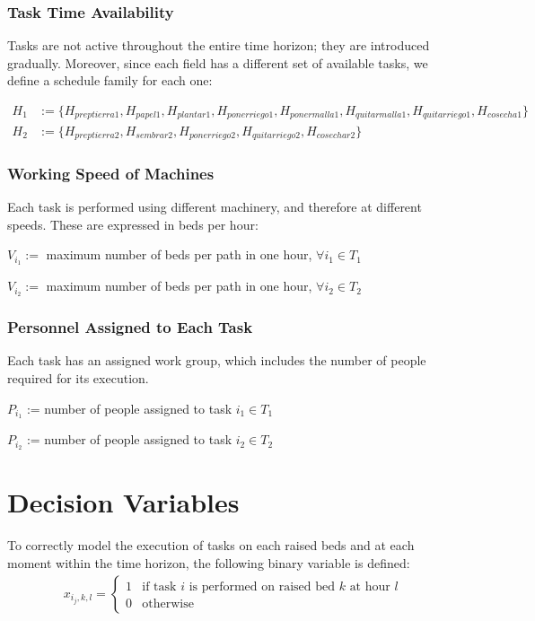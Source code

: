 \subsubsection{Task Time Availability}

Tasks are not active throughout the entire time horizon; they are introduced gradually.  
Moreover, since each field has a different set of available tasks, we define a schedule family for each one:

\[\begin{aligned}
    H_1 &:= \{H_{preptierra1},H_{papel1},H_{plantar1},H_{ponerriego1},H_{ponermalla1},H_{quitarmalla1},H_{quitarriego1},H_{cosecha1}\}\\
    H_2 &:= \{H_{preptierra2},H_{sembrar2},H_{ponerriego2},H_{quitarriego2},H_{cosechar2}\}   
\end{aligned}\]    

\subsubsection{Working Speed of Machines}

Each task is performed using different machinery, and therefore at different speeds. These are expressed in beds per hour:
\begin{center}
$V_{i_1} :=$ maximum number of beds per path in one hour, $\forall i_1 \in T_1$

$V_{i_2} :=$ maximum number of beds per path in one hour, $\forall i_2 \in T_2$
\end{center}




\subsubsection{Personnel Assigned to Each Task}

Each task has an assigned work group, which includes the number of people required for its execution.
\begin{center}
    $P_{i_1}$ := number of people assigned to task $i_1 \in T_1$

    $P_{i_2}$ := number of people assigned to task $i_2 \in T_2$    
\end{center}


\section*{Decision Variables}
To correctly model the execution of tasks on each raised beds and at each moment within the time horizon, the following binary variable is defined:
\[
\begin{aligned}
    x_{i_j,k,l} = 
    \begin{cases} 
        1 & \text{if task } i \text{ is performed on raised bed } k \text{ at hour } l \\
        0 & \text{otherwise}
    \end{cases}
\end{aligned}
\]

